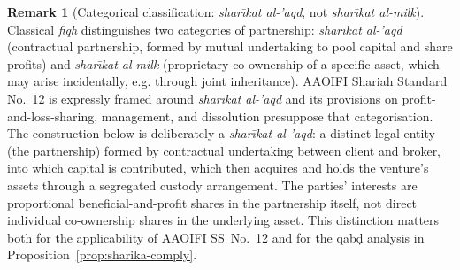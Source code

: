 \documentclass[preprint,12pt,authoryear]{elsarticle}
\theoremstyle{definition}
\newtheorem{remark}{Remark}[section]
\begin{document}
\begin{remark}[Categorical classification: \emph{shar\={\i}kat
    al-'aqd}, not \emph{shar\={\i}kat al-milk}]
\label{rem:sharikat-al-aqd}
Classical \emph{fiqh} distinguishes two categories of partnership:
\emph{shar\={\i}kat al-'aqd} (contractual partnership, formed by
mutual undertaking to pool capital and share profits) and
\emph{shar\={\i}kat al-milk} (proprietary co-ownership of a
specific asset, which may arise incidentally, e.g. through joint
inheritance). AAOIFI Shariah Standard No.~12 is expressly framed
around \emph{shar\={\i}kat al-'aqd} and its provisions on
profit-and-loss-sharing, management, and dissolution presuppose
that categorisation. The construction below is deliberately a
\emph{shar\={\i}kat al-'aqd}: a distinct legal entity (the
partnership) formed by contractual undertaking between client and
broker, into which capital is contributed, which then acquires and
holds the venture's assets through a segregated custody
arrangement. The parties' interests are proportional
beneficial-and-profit shares in the partnership itself, not direct
individual co-ownership shares in the underlying asset. This
distinction matters both for the applicability of AAOIFI
SS~No.~12 and for the qab\d{d} analysis in
Proposition~\ref{prop:sharika-comply}.
\end{remark}
\end{document}
